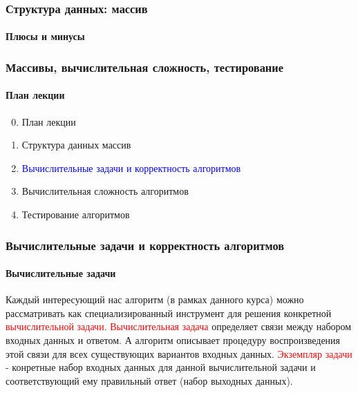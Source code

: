 \documentclass[aspectratio=169]{beamer}
\begin{document}
\begin{frame}
\frametitle{Структура данных: массив}
\framesubtitle{Плюсы и минусы}
\justifying
\small

\begin{figure}
    \captionsetup[subfigure]{labelformat=empty}
    \centering
\end{figure}
\end{frame}

\begin{frame}
\frametitle{Массивы, вычислительная сложность, тестирование}
\framesubtitle{План лекции}

\begin{enumerate}
  \setcounter{enumi}{-1}
  \item{План лекции}
  \item{Структура данных массив}
  \item{\textcolor{blue}{Вычислительные задачи и корректность алгоритмов}}
  \item{Вычислительная сложность алгоритмов}
  \item{Тестирование алгоритмов}
\end{enumerate}
\end{frame}

\begin{frame}
\frametitle{Вычислительные задачи и корректность алгоритмов}
\framesubtitle{Вычислительные задачи}
\justifying

Каждый интересующий нас алгоритм (в рамках данного курса) можно рассматривать как специализированный инструмент для решения конкретной \textcolor{red}{вычислительной задачи}.\newline\newline
\textcolor{red}{Вычислительная задача} определяет связи между набором входных данных и ответом. А алгоритм описывает процедуру воспроизведения этой связи для всех существующих вариантов входных данных.\newline\newline
\textcolor{red}{Экземпляр задачи} - конретные набор входных данных для данной вычислительной задачи и соответствующий ему правильный ответ (набор выходных данных).\newline\newline
\end{frame}
\end{document}
